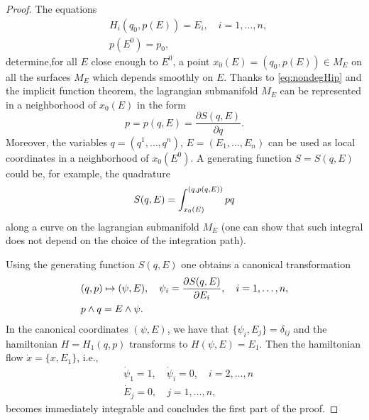 \documentclass[english,fontsize=11pt,paper=a5,oneside]{scrbook}
\let\d\relax
\newcommand{\d}{\mathrm{d}}
\theoremstyle{definition}
\begin{document}
\begin{proof}
  The equations
  \begin{align}
     & H_i(q_0, p(E)) = E_i,\quad i = 1,\ldots,n, \\
     & p(E^0) = p_0,
  \end{align}
  determine,for all $E$ close enough to $E^0$, a point $x_0(E) = (q_0, p(E))\in M_E$ on all the surfaces $M_E$ which depends smoothly on $E$.
  Thanks to \eqref{eq:nondegHip} and the implicit function theorem, the lagrangian submanifold $M_E$ can be represented in a neighborhood of $x_0(E)$ in the form
  \begin{equation}
    p = p(q,E) = \frac{\partial S(q,E)}{\partial q}.
  \end{equation}
  Moreover, the variables $q=(q^1, \ldots, q^n)$, $E= (E_1,\ldots,E_n)$ can be used as local coordinates in a neighborhood of $x_0(E^0)$. A generating function $S=S(q,E)$ could be, for example, the quadrature
  \begin{equation}
    S(q,E) = \int_{x_0(E)}^{(q,p(q,E))} p \d q
  \end{equation}
  along a curve on the lagrangian submanifold $M_E$ (one can show that such integral does not depend on the choice of the integration path).

  Using the generating function $S(q,E)$ one obtains a canonical transformation
  \begin{align}
     & (q,p)\mapsto (\psi, E), \quad \psi_i = \frac{\partial S(q,E)}{\partial E_i}, \quad i=1,\ldots,n, \\
     & \d p \wedge \d q = \d E \wedge \d \psi.
  \end{align}
  In the canonical coordinates $(\psi, E)$, we have that $\{\psi_i, E_j\} = \delta_{ij}$ and the hamiltonian $H = H_1(q,p)$ transforms to $H(\psi, E) = E_1$. Then the hamiltonian flow $\dot x = \{x, E_1\}$, i.e.,
  \begin{align}
     & \dot \psi_1 = 1, \quad \dot \psi_i = 0, \quad i=2,\ldots,n \\
     & \dot E_j = 0, \quad j = 1,\ldots, n,
  \end{align}
  becomes immediately integrable and concludes the first part of the proof.
  \medskip


\end{proof}
\end{document}
